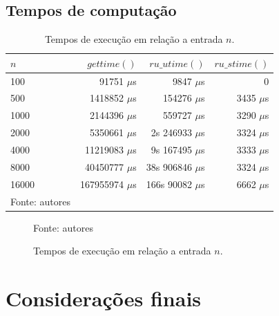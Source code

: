 \documentclass[12pt,a4paper]{article}
\begin{document}
\subsection{Tempos de computação}

\begin{table}[!h]
	\centering
	\caption{Tempos de execução em relação a entrada $n$.}
	\label{tab:tempos}
	\begin{tabular}{lrrr}
		\toprule 
		$n$ & $gettime()$ & $ru\_utime()$ & $ru\_stime()$ \\ 
		\midrule
		100 & 91751 $\mu$s & 9847 $\mu$s & 0 \\
		500 & 1418852 $\mu$s & 154276 $\mu$s & 3435 $\mu$s \\
		1000 & 2144396 $\mu$s & 559727 $\mu$s & 3290 $\mu$s \\
		2000 & 5350661 $\mu$s & 2s 246933 $\mu$s & 3324 $\mu$s \\
		4000 & 11219083 $\mu$s & 9s 167495 $\mu$s & 3333 $\mu$s \\
		8000 & 40450777 $\mu$s & 38s 906846 $\mu$s & 3324 $\mu$s \\
		16000 & 167955974 $\mu$s & 166s 90082 $\mu$s & 6662 $\mu$s \\
		\bottomrule
		\footnotesize Fonte: autores
	\end{tabular}
\end{table}

\begin{figure}[!h]
	\caption{Tempos de execução em relação a entrada $n$.}
	\label{fig:orientacao}
	\footnotesize \hphantom{spacessss}Fonte: autores
\end{figure}

\pagebreak

\section{Considerações finais}
\end{document}
